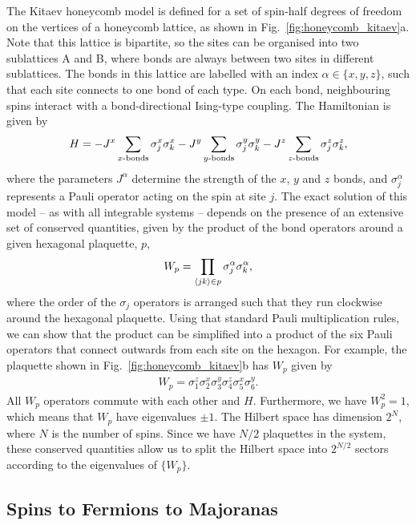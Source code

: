 The Kitaev honeycomb model is defined for a set of spin-half degrees of freedom on the vertices of a honeycomb lattice, as shown in Fig.~\ref{fig:honeycomb_kitaev}a. Note that this lattice is bipartite, so the sites can be organised into two sublattices A and B, where bonds are always between two sites in different sublattices. The bonds in this lattice are labelled with an index $\alpha \in \{x, y, z\}$, such that each site connects to one bond of each type. On each bond, neighbouring spins interact with a bond-directional Ising-type coupling. The Hamiltonian is given by
\begin{align} \label{eqn:kitaev_original_hamiltonian}
    H = -J^x \sum_{x\textup{-bonds}} \sigma_j^x \sigma_k^x
    -J^y \sum_{y\textup{-bonds}} \sigma_j^y \sigma_k^y
    -J^z \sum_{z\textup{-bonds}} \sigma_j^z \sigma_k^z,
\end{align}
where the parameters $J^\alpha$ determine the strength of the $x$, $y$ and $z$ bonds, and $\sigma_j^\alpha$ represents a Pauli operator acting on the spin at site $j$. The exact solution of this model -- as with all integrable systems --  depends on the presence of an extensive set of conserved quantities, given by the product of the bond operators around a given hexagonal plaquette, $p$, 
\begin{align}\label{eqn:wp_definition}
    W_p = \prod_{\braket{jk} \in p}
    \sigma_j^\alpha \sigma_k^\alpha,
\end{align}
where the order of the $\sigma_j$ operators is arranged such that they run clockwise around the hexagonal plaquette. Using that standard Pauli multiplication rules, we can show that the product can be simplified into a product of the six Pauli operators that connect outwards from each site on the hexagon. For example, the plaquette shown in Fig.~\ref{fig:honeycomb_kitaev}b has $W_p$ given by
\begin{align} \label{eqn:wp_operator}
    W_p = \sigma^z_1 \sigma^x_2 \sigma^y_3
    \sigma^z_4 \sigma^x_5 \sigma^y_6.
\end{align} 
All $W_p$ operators commute with each other and $H$. Furthermore, we have $W_p^2 = 1$, which means that $W_p$ have eigenvalues $\pm 1$. The Hilbert space has dimension $2^N$, where $N$ is the number of spins. Since we have $N/2$ plaquettes in the system, these conserved quantities allow us to split the Hilbert space into $2^{N/2}$ sectors according to the eigenvalues of $\{W_p\}$.

\subsection{Spins to Fermions to Majoranas} \label{sec:spins_to_majoranas}

